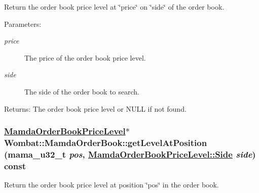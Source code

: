 Return the order book price level at \char`\"{}price\char`\"{} on \char`\"{}side\char`\"{} of the order book. 

\begin{Desc}
\item[Parameters:]
\begin{description}
\item[{\em price}]The price of the order book price level. \item[{\em side}]The side of the order book to search. \end{description}
\end{Desc}
\begin{Desc}
\item[Returns:]The order book price level or NULL if not found. \end{Desc}
\hypertarget{classWombat_1_1MamdaOrderBook_6fbc8b88d867547a29097a5a39ccf4ca}{
\subsubsection[getLevelAtPosition]{\setlength{\rightskip}{0pt plus 5cm}\hyperlink{classWombat_1_1MamdaOrderBookPriceLevel}{Mamda\-Order\-Book\-Price\-Level}$\ast$ Wombat::Mamda\-Order\-Book::get\-Level\-At\-Position (mama\_\-u32\_\-t {\em pos}, \hyperlink{classWombat_1_1MamdaOrderBookPriceLevel_384c34b0a74d874b8969dee9b0d3718d}{Mamda\-Order\-Book\-Price\-Level::Side} {\em side}) const}}
\label{classWombat_1_1MamdaOrderBook_6fbc8b88d867547a29097a5a39ccf4ca}


Return the order book price level at position \char`\"{}pos\char`\"{} in the order book. 

